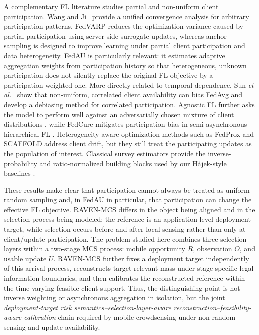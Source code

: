 \documentclass[letterpaper,journal]{IEEEtran}
\begin{document}
A complementary FL literature studies partial and non-uniform client
participation.  Wang and Ji~\cite{wang2022unified} provide a unified convergence
analysis for arbitrary participation patterns.  FedVARP
\cite{jhunjhunwala2022fedvarp} reduces the optimization variance caused by
partial participation using server-side surrogate updates, whereas anchor
sampling \cite{wu2023anchor} is designed to improve learning under partial
client participation and data heterogeneity.  FedAU
\cite{wang2024lightweight} is particularly relevant: it estimates adaptive
aggregation weights from participation history so that heterogeneous,
unknown participation does not silently replace the original FL objective by
a participation-weighted one.  More directly related to temporal dependence,
Sun \emph{et al.}~\cite{sun2025debiasing} show that non-uniform, correlated
client availability can bias FedAvg and develop a debiasing method for
correlated participation.  Agnostic FL further asks the model to perform well
against an adversarially chosen mixture of client distributions
\cite{mohri2019agnostic}, while FedCure mitigates participation bias in
semi-asynchronous hierarchical FL \cite{chen2026fedcure}.  Heterogeneity-aware
optimization methods such as FedProx and SCAFFOLD
\cite{li2020fedprox,karimireddy2020scaffold} address client drift, but they
still treat the participating updates as the population of interest.
Classical survey estimators provide the inverse-probability and ratio-normalized
building blocks used by our H\'ajek-style baselines
\cite{horvitz1952generalization,hajek1971comment}.

These results make clear that participation cannot always be treated as
uniform random sampling and, in FedAU in particular, that participation can
change the effective FL objective.  RAVEN-MCS differs in the object being
aligned and in the selection process being modeled: the reference is an
application-level deployment target, while selection occurs before and after
local sensing rather than only at client/update participation.  The problem
studied here combines three selection layers within a two-stage MCS process:
mobile opportunity $R$, observation $O$, and usable update $U$.  RAVEN-MCS
further fixes a deployment target independently of this arrival process,
reconstructs target-relevant mass under stage-specific legal information
boundaries, and then calibrates the reconstructed reference within the
time-varying feasible client support.  Thus, the distinguishing point is not
inverse weighting or asynchronous aggregation in isolation, but the joint
\emph{deployment-target risk semantics--selection-layer-aware
reconstruction--feasibility-aware calibration} chain required by mobile
crowdsensing under non-random sensing and update availability.
\end{document}
